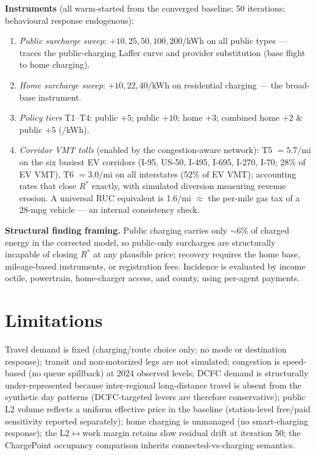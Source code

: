 \documentclass[11pt]{article}
\begin{document}
\textbf{Instruments} (all warm-started from the converged baseline; 50
iterations; behavioural response endogenous):
\begin{enumerate}\itemsep1pt
  \item \emph{Public surcharge sweep}: $+10,25,50,100,200$\textcent/kWh on all
  public types — traces the public-charging Laffer curve and provider
  substitution (base flight to home charging).
  \item \emph{Home surcharge sweep}: $+10,22,40$\textcent/kWh on residential
  charging — the broad-base instrument.
  \item \emph{Policy tiers} T1--T4: public $+5$; public $+10$; home $+3$;
  combined home $+2$ \& public $+5$ (\textcent/kWh).
  \item \emph{Corridor VMT tolls} (enabled by the congestion-aware network):
  T5 $=5.7$\textcent/mi on the six busiest EV corridors (I-95, US-50, I-495,
  I-695, I-270, I-70; 28\% of EV VMT), T6 $=3.0$\textcent/mi on all interstates
  (52\% of EV VMT); accounting rates that close $R^{*}$ exactly, with simulated
  diversion measuring revenue erosion. A universal RUC equivalent is
  1.6\textcent/mi $\approx$ the per-mile gas tax of a 28-mpg vehicle — an
  internal consistency check.
\end{enumerate}
\textbf{Structural finding framing.} Public charging carries only $\sim$6\% of
charged energy in the corrected model, so public-only surcharges are structurally
incapable of closing $R^{*}$ at any plausible price; recovery requires the home
base, mileage-based instruments, or registration fees. Incidence is evaluated by
income octile, powertrain, home-charger access, and county, using per-agent
payments.

\section{Limitations}
Travel demand is fixed (charging/route choice only; no mode or destination
response); transit and non-motorized legs are not simulated; congestion is
speed-based (no queue spillback) at 2024 observed levels; DCFC demand is
structurally under-represented because inter-regional long-distance travel is
absent from the synthetic day patterns (DCFC-targeted levers are therefore
conservative); public L2 volume reflects a uniform effective price in the
baseline (station-level free/paid sensitivity reported separately); home
charging is unmanaged (no smart-charging response); the L2$\leftrightarrow$work
margin retains slow residual drift at iteration 50; the ChargePoint occupancy
comparison inherits connected-vs-charging semantics.
\end{document}
